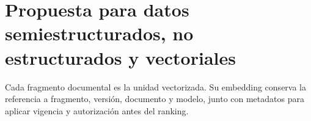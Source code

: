 \section{Propuesta para datos semiestructurados, no estructurados y vectoriales}
Cada fragmento documental es la unidad vectorizada. Su embedding conserva la referencia a fragmento, versión, documento y modelo, junto con metadatos para aplicar vigencia y autorización antes del ranking.
